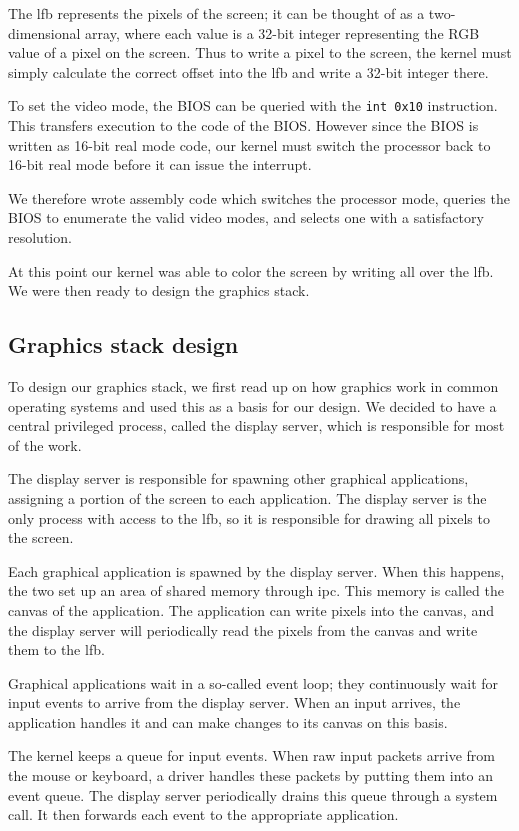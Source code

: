 \documentclass{article}
\begin{document}
The \gls{lfb} represents the pixels of the screen; it can be thought of as a
two-dimensional array, where each value is a 32-bit integer representing the
RGB value of a pixel on the screen. Thus to write a pixel to the screen, the
kernel must simply calculate the correct offset into the \gls{lfb} and write a
32-bit integer there.

To set the video mode, the BIOS can be queried with the \texttt{int 0x10}
instruction. This transfers execution to the code of the BIOS. However since
the BIOS is written as 16-bit real mode code, our kernel must switch the
processor back to 16-bit real mode before it can issue the interrupt.

We therefore wrote assembly code which switches the processor mode,
queries the BIOS to enumerate the valid video modes, and selects one with a
satisfactory resolution.

At this point our kernel was able to color the screen by writing all over the
\gls{lfb}. We were then ready to design the graphics stack.


\subsection{Graphics stack design}
To design our graphics stack, we first read up on how graphics work in common
operating systems and used this as a basis for our design. We decided to
have a central privileged process, called the display server, which is
responsible for most of the work.

The display server is responsible for spawning other graphical applications,
assigning a portion of the screen to each application. The display server is
the only process with access to the \gls{lfb}, so it is responsible for
drawing all pixels to the screen. 

Each graphical application is spawned by the display server. When this
happens, the two set up an area of shared memory through \gls{ipc}. This
memory is called the canvas of the application. The application can write
pixels into the canvas, and the display server will periodically read the
pixels from the canvas and write them to the \gls{lfb}.

Graphical applications wait in a so-called event loop; they continuously wait
for input events to arrive from the display server. When an input arrives, the
application handles it and can make changes to its canvas on this basis.

The kernel keeps a queue for input events. When raw input packets arrive from
the mouse or keyboard, a driver handles these packets by putting them into an
event queue. The display server periodically drains this queue through a
system call. It then forwards each event to the appropriate application.
\end{document}
